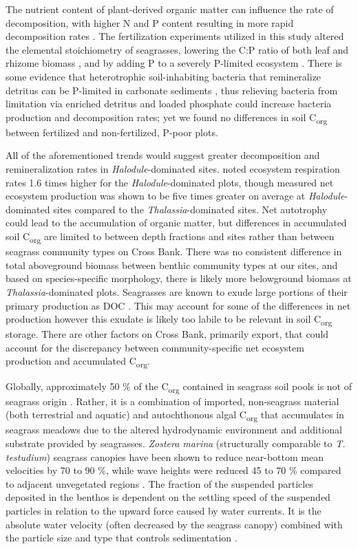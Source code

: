	The nutrient content of plant-derived organic matter can influence the rate of decomposition, with higher N and P content resulting in more rapid decomposition rates \citep{Enriquez:1993ul}. The fertilization experiments utilized in this study altered the elemental stoichiometry of seagrasses, lowering the C:P ratio of both leaf and rhizome biomass \citep{Herbert:2008di, Powell:1989tt}, and by adding P to a severely P-limited ecosystem \citep{Fourqurean:1992we}. There is some evidence that heterotrophic soil-inhabiting bacteria that remineralize detritus can be P-limited in carbonate sediments \citep{Lopez:1995uo, Lopez:1998ty}, thus relieving bacteria from limitation via enriched detritus and loaded phosphate could increase bacteria production and decomposition rates; yet we found no differences in soil C\textsubscript{org} between fertilized and non-fertilized, P-poor plots.

	All of the aforementioned trends would suggest greater decomposition and remineralization rates in \textit{Halodule}-dominated sites. \citet{Herbert:2008di} noted ecosystem respiration rates 1.6 times higher for the \textit{Halodule}-dominated plots, though measured net ecosystem production was shown to be five times greater on average at \textit{Halodule}-dominated sites compared to the \textit{Thalassia}-dominated sites. Net autotrophy could lead to the accumulation of organic matter, but differences in accumulated soil C\textsubscript{org} are limited to between depth fractions and sites rather than between seagrass community types on Cross Bank. There was no consistent difference in total aboveground biomass between benthic community types at our sites, and based on species-specific morphology, there is likely more belowground biomass at \textit{Thalassia}-dominated plots. Seagrasses are known to exude large portions of their primary production as DOC \citep{Ziegler:1999wx}. This may account for some of the differences in net production however this exudate is likely too labile to be relevant in soil C\textsubscript{org} storage. There are other factors on Cross Bank, primarily export, that could account for the discrepancy between community-specific net ecosystem production and accumulated C\textsubscript{org}.

	Globally, approximately 50 \% of the C\textsubscript{org} contained in seagrass soil pools is not of seagrass origin \citep{Gacia:2002tt, Kennedy:2010if}. Rather, it is a combination of imported, non-seagrass material (both terrestrial and aquatic) and autochthonous algal C\textsubscript{org}  that accumulates in seagrass meadows due to the altered hydrodynamic environment and additional substrate provided by seagrasses. \textit{Zostera marina} (structurally comparable to \textit{T. testudium}) seagrass canopies have been shown to reduce near-bottom mean velocities by 70 to 90 \%, while wave heights were reduced 45 to 70 \% compared to adjacent unvegetated regions \citep{Hansen:2012gl}. The fraction of the suspended particles deposited in the benthos is dependent on the settling speed of the suspended particles in relation to the upward force caused by water currents. It is the absolute water velocity (often decreased by the seagrass canopy) combined with the particle size and type that controls sedimentation \citep{Boer:2007ch}.

